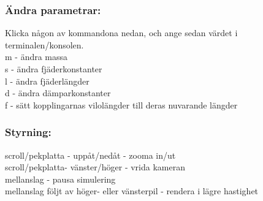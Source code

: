 \documentclass[a4paper,12pt,oneside,final,swedish]{extarticle}
\begin{document}
\subsubsection{Ändra parametrar:}
Klicka någon av kommandona nedan, och ange sedan värdet i terminalen/konsolen.
\\m - ändra massa
\\s - ändra fjäderkonstanter
\\l - ändra fjäderlängder
\\d - ändra dämparkonstanter
\\f - sätt kopplingarnas vilolängder till deras nuvarande längder
\subsubsection{ Styrning:}
scroll/pekplatta - uppåt/nedåt - zooma in/ut
\\scroll/pekplatta- vänster/höger - vrida kameran
\\mellanslag - pausa simulering
\\mellanslag följt av höger- eller vänsterpil - rendera i lägre hastighet
\end{document}
